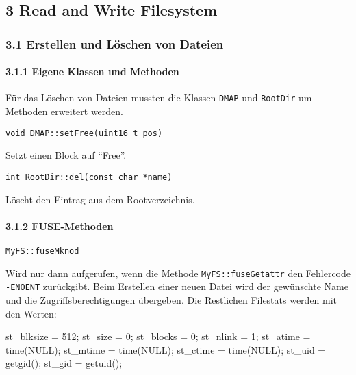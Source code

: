 \documentclass[]{article}
\newenvironment{Shaded}{}{}
\newcommand{\DecValTok}[1]{\textcolor[rgb]{0.25,0.63,0.44}{#1}}
\newcommand{\NormalTok}[1]{#1}
\let\oldparagraph\paragraph
\renewcommand{\paragraph}[1]{\oldparagraph{#1}\mbox{}}
\begin{document}
\hypertarget{read-and-write-filesystem}{%
\subsection{3 Read and Write
Filesystem}\label{read-and-write-filesystem}}

\hypertarget{erstellen-und-luxf6schen-von-dateien}{%
\subsubsection{3.1 Erstellen und Löschen von
Dateien}\label{erstellen-und-luxf6schen-von-dateien}}

\hypertarget{eigene-klassen-und-methoden-1}{%
\paragraph{3.1.1 Eigene Klassen und
Methoden}\label{eigene-klassen-und-methoden-1}}

Für das Löschen von Dateien mussten die Klassen \texttt{DMAP} und
\texttt{RootDir} um Methoden erweitert werden.

\texttt{void\ DMAP::setFree(uint16\_t\ pos)}

Setzt einen Block auf ``Free''.

\texttt{int\ RootDir::del(const\ char\ *name)}

Löscht den Eintrag aus dem Rootverzeichnis.


\hypertarget{fuse-methoden-1}{%
\paragraph{3.1.2 FUSE-Methoden}\label{fuse-methoden-1}}

\texttt{MyFS::fuseMknod}

Wird nur dann aufgerufen, wenn die Methode \texttt{MyFS::fuseGetattr} den
Fehlercode \texttt{-ENOENT} zurückgibt. Beim Erstellen einer neuen
Datei wird der gewünschte Name und die Zugriffsberechtigungen übergeben.
Die Restlichen Filestats werden mit den Werten:

\begin{Shaded}
  \begin{framed}
\begin{Highlighting}[]
\NormalTok{st_blksize = }\DecValTok{512}\NormalTok{;}
\NormalTok{st_size = }\DecValTok{0}\NormalTok{;}
\NormalTok{st_blocks = }\DecValTok{0}\NormalTok{;}
\NormalTok{st_nlink = }\DecValTok{1}\NormalTok{;}
\NormalTok{st_atime = time(NULL);}
\NormalTok{st_mtime = time(NULL);}
\NormalTok{st_ctime = time(NULL);}
\NormalTok{st_uid = getgid();}
\NormalTok{st_gid = getuid();}
\end{Highlighting}
\end{framed}
\end{Shaded}
\end{document}

